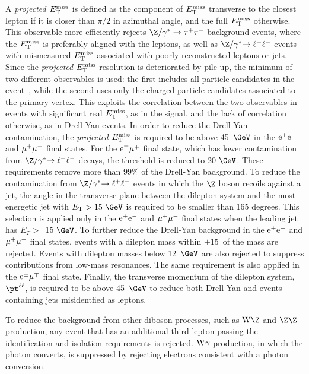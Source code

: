 A {\it projected $E_\mathrm{T}^{\mathrm{miss}}$} is defined
as the component of $E_\mathrm{T}^{\mathrm{miss}}$ transverse to the closest lepton if it is closer
than $\pi/2$ in azimuthal angle, and the full $E_\mathrm{T}^{\mathrm{miss}}$ otherwise.
This observable more efficiently rejects $\dytt$ background events, where the $E_\mathrm{T}^{\mathrm{miss}}$
is preferably aligned with the leptons, as well as $\dyll$ events with mismeasured
$E_\mathrm{T}^{\mathrm{miss}}$ associated with poorly reconstructed leptons or jets.
Since the {\it projected $E_\mathrm{T}^{\mathrm{miss}}$} resolution is deteriorated by pile-up,
the minimum of two different observables is used: the first includes all particle candidates in the
event~\cite{PFT-09-001}, while the second uses only the charged
particle candidates associated to the primary vertex. This exploits
the correlation between the two observables in events with significant real
{\it $E_\mathrm{T}^{\mathrm{miss}}$}, as in the signal, and the lack of correlation otherwise, as
in Drell-Yan events.  
In order to reduce the Drell-Yan contamination, the {\it projected $E_\mathrm{T}^{\mathrm{miss}}$} is
required to be above 45~$\GeV$ in the $\mathrm{\mathrm{e}}^{+}\mathrm{\mathrm{e}}^{-}$ and $\mu^{+}\mu^{-}$ final states.
For the $\mathrm{\mathrm{e}}^{\pm}\mu^{\mp}$ final state, which has lower
contamination from $\dyll$ decays, the threshold is reduced to 20 $\GeV$.
These requirements remove more than 99\% of the Drell-Yan background.
To reduce the contamination from $\dyll$ events in which the $\Z$ boson recoils
against a jet, the angle in the transverse plane between the dilepton system and
the most energetic jet with $\Et > 15~\GeV$ is required to be smaller than 165 degrees.
This selection is applied only in the $\mathrm{\mathrm{e}}^{+}\mathrm{\mathrm{e}}^{-}$ and $\mu^{+}\mu^{-}$
final states when
the leading jet has $E_T>$~15 $\GeV$.
To further reduce the Drell-Yan background in the
$\mathrm{\mathrm{e}}^{+}\mathrm{\mathrm{e}}^{-}$ and $\mu^{+}\mu^{-}$ final states,
events with a dilepton mass within $\pm 15$~\GeV of
the \Z mass are rejected.
Events with dilepton masses below 12~$\GeV$ are also rejected
to suppress contributions from low-mass resonances. The same
requirement is also
applied in the $\mathrm{\mathrm{e}}^{\pm}\mu^{\mp}$ final state. 
Finally, the transverse momentum of the dilepton system, $\pt^{\ell\ell}$,
is required to be above 45~$\GeV$ to reduce both Drell-Yan and 
events containing jets misidentfied as leptons.

To reduce the background from other diboson processes, such as $\WZ$ and $\ZZ$
production, any event that has an additional third lepton passing the
identification and isolation requirements is rejected. 
$\mathrm{W}\gamma$ production, in which the photon converts, is suppressed
by rejecting electrons consistent with a photon conversion.

